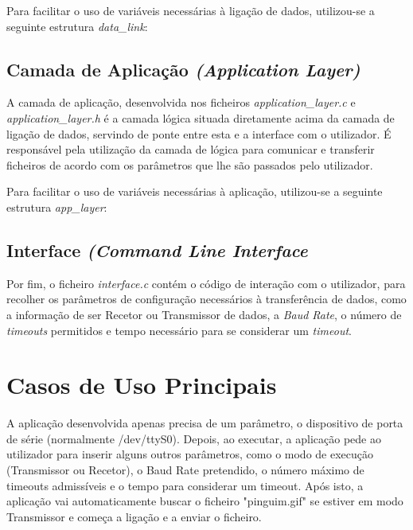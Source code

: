 \documentclass[11pt]{article}
\begin{document}
Para facilitar o uso de variáveis necessárias à ligação de dados, utilizou-se a seguinte estrutura \textit{data\_link}:


\subsection{Camada de Aplicação \textit{(Application Layer)}}

A camada de aplicação, desenvolvida nos ficheiros \textit{application\_layer.c} e \textit{application\_layer.h} é a camada lógica situada diretamente acima da camada de ligação de dados, servindo de ponte entre esta e a interface com o utilizador. É responsável pela utilização da camada de lógica para comunicar e transferir ficheiros de acordo com os parâmetros que lhe são passados pelo utilizador.

Para facilitar o uso de variáveis necessárias à aplicação, utilizou-se a seguinte estrutura \textit{app\_layer}:


\subsection{Interface \textit{(Command Line Interface}}

Por fim, o ficheiro \textit{interface.c} contém o código de interação com o utilizador, para recolher os parâmetros de configuração necessários à transferência de dados, como a informação de ser Recetor ou Transmissor de dados, a \textit{Baud Rate}, o número de \textit{timeouts} permitidos e tempo necessário para se considerar um \textit{timeout}.

\newpage

\section{Casos de Uso Principais}

A aplicação desenvolvida apenas precisa de um parâmetro, o dispositivo de porta de série (normalmente /dev/ttyS0).
Depois, ao executar, a aplicação pede ao utilizador para inserir alguns outros parâmetros, como o modo de execução (Transmissor ou Recetor), o Baud Rate pretendido, o número máximo de timeouts admissíveis e o tempo para considerar um timeout.
Após isto, a aplicação vai automaticamente buscar o ficheiro "pinguim.gif" se estiver em modo Transmissor e começa a ligação e a enviar o ficheiro.
\end{document}
